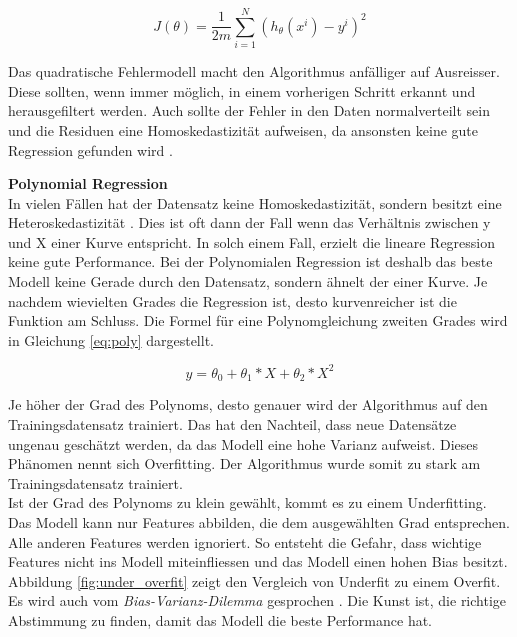 \begin{equation}\label{eq:cost_function}
J(\theta) = \frac{1}{2m} \sum_{i=1}^{N} (h_\theta(x^i) - y^i)^2
\end{equation}

Das quadratische Fehlermodell macht den Algorithmus anfälliger auf Ausreisser. Diese sollten, wenn immer möglich, in einem vorherigen Schritt erkannt und herausgefiltert werden. Auch sollte der Fehler in den Daten normalverteilt sein und die Residuen eine Homoskedastizität aufweisen, da ansonsten keine gute Regression gefunden wird \cite{gradient_descent, gradient_descent_2, gradient_descent_3}.

\textbf{Polynomial Regression}\\
In vielen Fällen hat der Datensatz keine Homoskedastizität, sondern besitzt eine Heteroskedastizität \cite{poly}. Dies ist oft dann der Fall wenn das Verhältnis zwischen y und X einer Kurve entspricht. In solch einem Fall, erzielt die lineare Regression keine gute Performance.
Bei der Polynomialen Regression ist deshalb das beste Modell keine Gerade durch den Datensatz, sondern ähnelt der einer Kurve. Je nachdem wievielten Grades die Regression ist, desto kurvenreicher ist die Funktion am Schluss. Die Formel für eine Polynomgleichung zweiten Grades wird in Gleichung \eqref{eq:poly} dargestellt.

\begin{equation}\label{eq:poly}
y = \theta_0 + \theta_1 * X + \theta_2 * X^2
\end{equation}

Je höher der Grad des Polynoms, desto genauer wird der Algorithmus auf den Trainingsdatensatz trainiert. Das hat den Nachteil, dass neue Datensätze ungenau geschätzt werden, da das Modell eine hohe Varianz aufweist. Dieses Phänomen nennt sich Overfitting. Der Algorithmus wurde somit zu stark am Trainingsdatensatz trainiert.\\
Ist der Grad des Polynoms zu klein gewählt, kommt es zu einem Underfitting. Das Modell kann nur Features abbilden, die dem ausgewählten Grad entsprechen. Alle anderen Features werden ignoriert. So entsteht die Gefahr, dass wichtige Features nicht ins Modell miteinfliessen und das Modell einen hohen Bias besitzt. Abbildung \ref{fig:under_overfit} zeigt den Vergleich von Underfit zu einem Overfit.\\
Es wird auch vom \textit{Bias-Varianz-Dilemma} gesprochen \cite{bias_variance, bias_variance_2}. Die Kunst ist, die richtige Abstimmung zu finden, damit das Modell die beste Performance hat.

